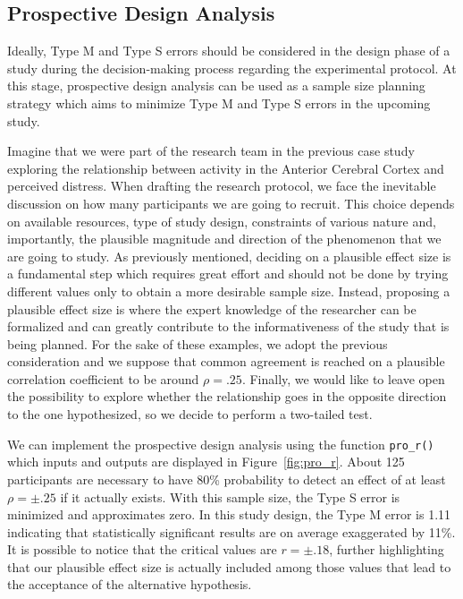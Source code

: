 \documentclass{article}\usepackage[]{graphicx}\usepackage[]{color}
\begin{document}

\subsection{Prospective Design Analysis}

Ideally, Type M and Type S errors should be considered in the design phase of a study during the decision-making process regarding the experimental protocol. At this stage, prospective design analysis can be used as a sample size planning strategy which aims to minimize Type M and Type S errors in the upcoming study.

Imagine that we were part of the research team in the previous case study exploring the relationship between activity in the Anterior Cerebral Cortex and perceived distress. When drafting the research protocol, we face the inevitable discussion on how many participants we are going to recruit. This choice depends on available resources, type of study design, constraints of various nature and, importantly, the plausible magnitude and direction of the phenomenon that we are going to study. As previously mentioned, deciding on a plausible effect size is a fundamental step which requires great effort and should not be done by trying different values only to obtain a more desirable sample size. Instead, proposing a plausible effect size is where the expert knowledge of the researcher can be formalized and can greatly contribute to the informativeness of the study that is being planned. For the sake of these examples, we adopt the previous consideration and we suppose that common agreement is reached on a plausible correlation coefficient to be around $\rho=.25$. Finally, we would like to leave open the possibility to explore whether the relationship goes in the opposite direction to the one hypothesized, so we decide to perform a two-tailed test.

We can implement the prospective design analysis using the function \texttt{pro\_r()} which inputs and outputs are displayed in Figure~\ref{fig:pro_r}. About 125 participants are necessary to have 80\% probability to detect an effect of at least $\rho=\pm .25$ if it actually exists. With this sample size, the Type S error is minimized and approximates zero. In this study design, the Type M error is 1.11 indicating that statistically significant results are on average exaggerated by 11\%. It is possible to notice that the critical values are $r=\pm .18$, further highlighting that our plausible effect size is actually included among those values that lead to the acceptance of the alternative hypothesis.
\end{document}
